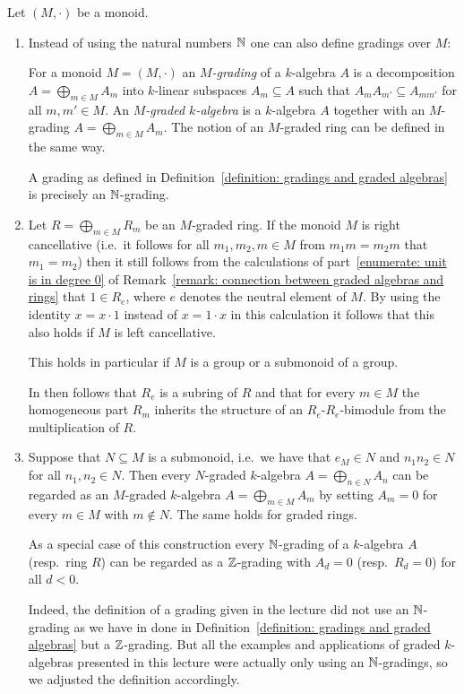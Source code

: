 \begin{remark}
  Let $(M,\cdot)$ be a monoid.  
  \begin{enumerate}
    \item
      Instead of using the natural numbers $\mathbb{N}$ one can also define gradings over $M$:
      
      For a monoid $M = (M,\cdot)$ an \emph{$M$-grading} of a $k$-algebra $A$ is a decomposition $A = \bigoplus_{m \in M} A_m$ into $k$-linear subspaces $A_m \subseteq A$ such that $A_m A_{m'} \subseteq A_{mm'}$ for all $m, m' \in M$.
      An \emph{$M$-graded $k$-algebra} is a $k$-algebra $A$ together with an $M$-grading $A = \bigoplus_{m \in M} A_m$.
      The notion of an $M$-graded ring can be defined in the same way.
      
      A grading as defined in Definition~\ref{definition: gradings and graded algebras} is precisely an $\mathbb{N}$-grading.
    \item
      Let $R = \bigoplus_{m \in M} R_m$ be an $M$-graded ring.
      If the monoid $M$ is right cancellative (i.e.\ it follows for all $m_1, m_2, m \in M$ from $m_1 m = m_2 m$ that $m_1 = m_2$) then it still follows from the calculations of part~\ref{enumerate: unit is in degree 0} of Remark~\ref{remark: connection between graded algebras and rings} that $1 \in R_e$, where $e$ denotes the neutral element of $M$.
      By using the identity $x = x \cdot 1$ instead of $x = 1 \cdot x$ in this calculation it follows that this also holds if $M$ is left cancellative.
      
      This holds in particular if $M$ is a group or a submonoid of a group.
      
      In then follows that $R_e$ is a subring of $R$ and that for every $m \in M$ the homogeneous part $R_m$ inherits the structure of an $R_e$-$R_e$-bimodule from the multiplication of $R$.
    \item
      Suppose that $N \subseteq M$ is a submonoid, i.e.\ we have that $e_M \in N$ and $n_1 n_2 \in N$ for all $n_1, n_2 \in N$.
      Then every $N$-graded $k$-algebra $A = \bigoplus_{n \in N} A_n$ can be regarded as an $M$-graded $k$-algebra $A = \bigoplus_{m \in M} A_m$ by setting $A_m = 0$ for every $m \in M$ with $m \notin N$.
      The same holds for graded rings.
      
      As a special case of this construction every $\mathbb{N}$-grading of a $k$-algebra $A$ (resp.\ ring $R$) can be regarded as a $\mathbb{Z}$-grading with $A_d = 0$ (resp.\ $R_d = 0$) for all $d < 0$.
      
      Indeed, the definition of a grading given in the lecture did not use an $\mathbb{N}$-grading as we have in done in Definition~\ref{definition: gradings and graded algebras} but a $\mathbb{Z}$-grading.
      But all the examples and applications of graded $k$-algebras presented in this lecture were actually only using an $\mathbb{N}$-gradings, so we adjusted the definition accordingly.
  \end{enumerate}
\end{remark}



